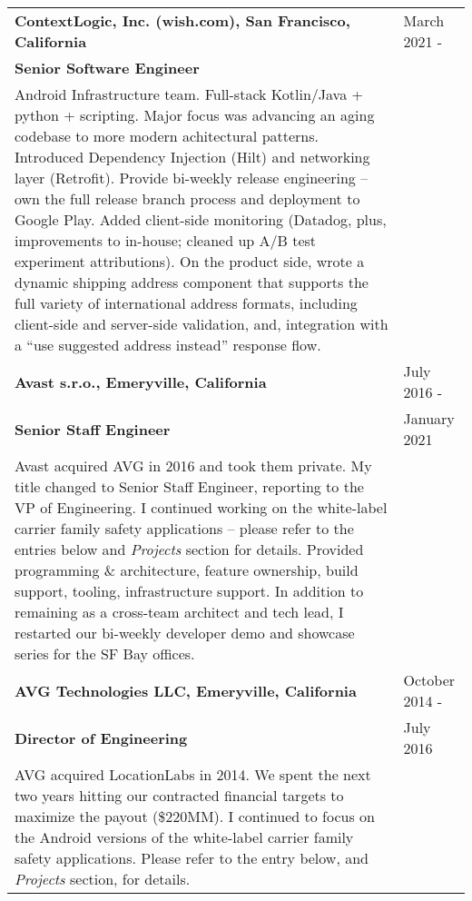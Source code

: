 \begin{tabular}{p{5.2in}@{\hspace{1.5cm}}l}

	\bf  ContextLogic, Inc. (wish.com), San Francisco, California   	    & March 2021 -  \\
	\bf  Senior Software Engineer	&  \\[4pt]
	
	   Android Infrastructure team. Full-stack Kotlin/Java + python + scripting.  
	   Major focus was advancing an aging codebase to more
	   modern achitectural patterns.  Introduced Dependency Injection (Hilt) and
	   networking layer (Retrofit).  Provide bi-weekly release engineering -- own the full release branch process and 
	   deployment to Google Play.  Added client-side monitoring
	   (Datadog, plus, improvements to in-house; cleaned up A/B test experiment attributions). 
	   On the product side, wrote a dynamic
	   shipping address component that supports the full variety of international address formats,
	   including client-side and server-side validation, and, integration with a 
	   ``use suggested address instead'' response flow.  
		 \\[9pt]


	\bf  Avast s.r.o., Emeryville, California   	    & July 2016 -  \\
	\bf  Senior Staff Engineer	& January 2021 \\[4pt]
	
	   Avast acquired AVG in 2016 and took them private.  My title changed to Senior Staff Engineer,
	   reporting to the VP of Engineering. 
	   I continued working on the white-label carrier family safety applications --
           please refer to the entries below and {\it Projects} section for details.
	   Provided programming \& architecture, 
		feature ownership, build support, tooling, infrastructure support. 
	    In addition to remaining as a cross-team architect and tech lead,
	   I restarted our bi-weekly developer demo and showcase series for the SF Bay offices.
		 \\[9pt]
	   
	\bf AVG Technologies LLC, Emeryville, California   	& October 2014 -  \\
	\bf  Director of Engineering 	& July 2016 \\[4pt]
	
	   AVG acquired LocationLabs in 2014. We spent the next two years hitting our contracted
	   financial targets to maximize the payout (\$220MM).   
	   I continued to focus on the Android versions of the white-label carrier family safety applications.
	   Please refer to the entry below, and {\it Projects} section, for details. \\[9pt]
	   
	
	   

\end{tabular}

